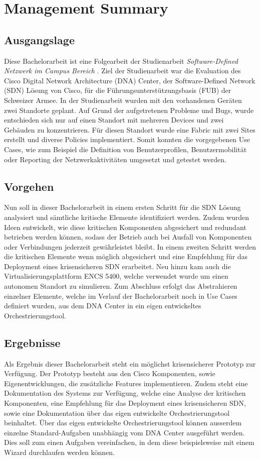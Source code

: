 \section{Management Summary}

\subsection{Ausgangslage}
Diese Bachelorarbeit ist eine Folgearbeit der Studienarbeit \textit{Software-Defined Netzwerk im Campus Bereich} \cite{studienarbeit}. Ziel der Studienarbeit war die Evaluation des Cisco Digital Network Architecture (DNA) Center, der Software-Defined Network (SDN) Lösung von Cisco, für die Führungsunterstützungsbasis (FUB) der Schweizer Armee. In der Studienarbeit wurden mit den vorhandenen Geräten zwei Standorte geplant. Auf Grund der aufgetretenen Probleme und Bugs, wurde entschieden sich nur auf einen Standort mit mehreren Devices und zwei Gebäuden zu konzentrieren. Für diesen Standort wurde eine Fabric mit zwei Sites erstellt und diverse Policies implementiert. Somit konnten die vorgegebenen Use Cases, wie zum Beispiel die Definition von Benutzerprofilen, Benutzermobilität oder Reporting der Netzwerkaktivitäten umgesetzt und getestet werden.

\subsection{Vorgehen}
Nun soll in dieser Bachelorarbeit in einem ersten Schritt für die SDN Lösung analysiert und sämtliche kritische Elemente identifiziert werden. Zudem wurden Ideen entwickelt, wie diese kritischen Komponenten abgesichert und redundant betrieben werden können, sodass der Betrieb auch bei Ausfall von Komponenten oder Verbindungen jederzeit ge\-währ\-leis\-tet bleibt. In einem zweiten Schritt werden die kritischen Elemente wenn möglich abgesichert und eine Empfehlung für das Deployment eines krisensicheren SDN erarbeitet. Neu hinzu kam auch die Virtualisierungsplattform ENCS 5400, welche verwendet wurde um einen autonomen Standort zu simulieren. Zum Abschluss erfolgt das Abstrahieren einzelner Elemente, welche im Verlauf der Bachelorarbeit noch in Use Cases definiert wurden, aus dem DNA Center in ein eigen entwickeltes Orchestrierungstool. 

\subsection{Ergebnisse}
Als Ergebnis dieser Bachelorarbeit steht ein möglichst krisensicherer Prototyp zur Ver\-fü\-gung. Der Prototyp besteht aus den Cisco Komponenten, sowie Eigenentwicklungen, die zu\-sätz\-liche Features implementieren. Zudem steht eine Dokumentation des Systems zur Verfügung, welche eine Analyse der kritischen Komponenten, eine Empfehlung für das Deployment eines krisensicheren SDN, sowie eine Dokumentation über das eigen entwickelte Or\-ches\-t\-rie\-rungstool beinhaltet. Über das eigen entwickelte Orchestrierungstool können ausserdem einzelne Standard-Aufgaben unabhängig vom DNA Center ausgeführt werden. Dies soll zum einen Aufgaben vereinfachen, in dem diese beispielsweise mit einem Wizard durchlaufen werden können. 
 
